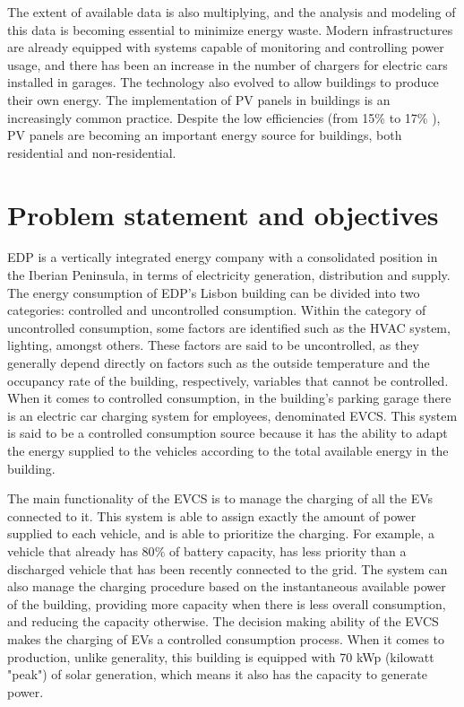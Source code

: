 The extent of available data is also multiplying, and the analysis and modeling of this data is becoming essential to minimize energy waste. Modern infrastructures are already equipped with systems capable of monitoring and controlling power usage, and there has been an increase in the number of chargers for electric cars installed in garages. The technology also evolved to allow buildings to produce their own energy. The implementation of \ac{PV} panels in buildings is an increasingly common practice. Despite the low efficiencies (from 15\% to 17\% \cite{pv}), \ac{PV} panels are becoming an important energy source for buildings, both  residential and non-residential. 









\section{Problem statement and objectives}


\ac{EDP} is a vertically integrated energy company with a consolidated position in the Iberian Peninsula, in terms of electricity generation, distribution and supply. The energy consumption of \ac{EDP}'s Lisbon building can be divided into two categories: controlled and uncontrolled consumption. Within the category of uncontrolled consumption, some factors are identified such as the \ac{HVAC} system, lighting, amongst others. These factors are said to be uncontrolled, as they generally depend directly on factors such as the outside temperature and the occupancy rate of the building, respectively, variables that cannot be controlled. When it comes to controlled consumption, in the building's parking garage there is an electric car charging system for employees, denominated \ac{EVCS}. This system is said to be a controlled consumption source because it has the ability to adapt the energy supplied to the vehicles according to the total available energy in the building. 

The main functionality of the \ac{EVCS} is to manage the charging of all the \ac{EV}s connected to it. This system is able to assign exactly the amount of power supplied to each vehicle, and is able to prioritize the charging. For example, a vehicle that already has 80$\%$ of battery capacity, has less priority than a discharged vehicle that has been recently connected to the grid. The system can also manage the charging procedure based on the instantaneous available power of the building, providing more capacity when there is less overall consumption, and reducing the capacity otherwise. The decision making ability of the \ac{EVCS} makes the charging of \ac{EV}s a controlled consumption process. When it comes to production, unlike generality, this building is equipped with 70 kWp (kilowatt "peak") of solar generation, which means it also has the capacity to generate power. 



